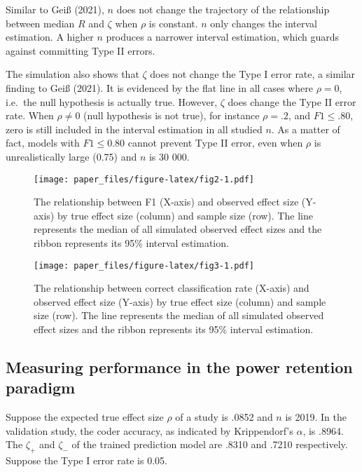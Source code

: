 \documentclass[english,man,floatsintext]{apa6}
\begin{document}
Similar to Geiß (2021), \(n\) does not change the trajectory of the relationship between median \(R\) and \(\zeta\) when \(\rho\) is constant. \(n\) only changes the interval estimation. A higher \(n\) produces a narrower interval estimation, which guards against committing Type II errors.

The simulation also shows that \(\zeta\) does not change the Type I error rate, a similar finding to Geiß (2021). It is evidenced by the flat line in all cases where \(\rho = 0\), i.e.~the null hypothesis is actually true. However, \(\zeta\) does change the Type II error rate. When \(\rho \neq 0\) (null hypothesis is not true), for instance \(\rho = .2\), and \(F1 \le .80\), zero is still included in the interval estimation in all studied \(n\). As a matter of fact, models with \(F1 \le 0.80\) cannot prevent Type II error, even when \(\rho\) is unrealistically large (0.75) and \(n\) is 30 000.

\begin{figure}
\centering
\texttt{[image: paper\_files/figure-latex/fig2-1.pdf]}
\caption{\label{fig:fig2}The relationship between F1 (X-axis) and observed effect size (Y-axis) by true effect size (column) and sample size (row). The line represents the median of all simulated observed effect sizes and the ribbon represents its 95\% interval estimation.}
\end{figure}

\begin{figure}
\centering
\texttt{[image: paper\_files/figure-latex/fig3-1.pdf]}
\caption{\label{fig:fig3}The relationship between correct classification rate (X-axis) and observed effect size (Y-axis) by true effect size (column) and sample size (row). The line represents the median of all simulated observed effect sizes and the ribbon represents its 95\% interval estimation.}
\end{figure}

\hypertarget{measuring-performance-in-the-power-retention-paradigm}{%
\subsection{Measuring performance in the power retention paradigm}\label{measuring-performance-in-the-power-retention-paradigm}}

Suppose the expected true effect size \(\rho\) of a study is .0852 and \(n\) is 2019. In the validation study, the coder accuracy, as indicated by Krippendorf's \(\alpha\), is .8964. The \(\zeta_{+}\) and \(\zeta_{-}\) of the trained prediction model are .8310 and .7210 respectively. Suppose the Type I error rate is 0.05.
\end{document}
